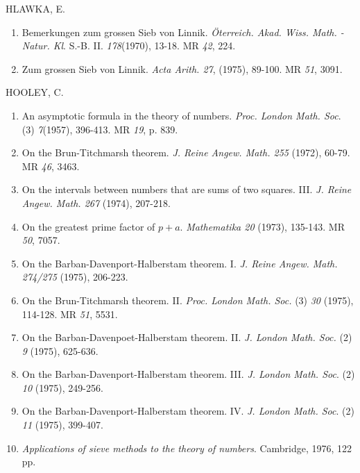 \begin{thebibliography}{99}
 HLAWKA, E.
\begin{enumerate}
\item Bemerkungen zum grossen Sieb von
  Linnik. \textit{\"Oterreich. Akad. Wiss. Math. -
    Natur. Kl}. S.-B. II. {\em 178}(1970), 13-18. MR {\em 42}, 224.

\item Zum grossen Sieb von Linnik. \textit{Acta
  Arith. 27}, (1975), 89-100. MR {\em 51}, 3091. 
\end{enumerate}

 HOOLEY, C.\pageoriginale
\begin{enumerate}
\item An asymptotic formula in the theory of
  numbers. \textit{Proc. London Math. Soc}. (3) {\em 7}(1957),
  396-413. MR {\em 19}, p. 839. 

\item On the Brun-Titchmarsh theorem. \textit{J. Reine
  Angew. Math. 255} (1972), 60-79. MR {\em 46}, 3463. 

\item On the intervals between numbers that are sums of two
  squares. III. \textit{J. Reine Angew. Math. 267} (1974), 207-218. 

\item On the greatest prime factor of $p+a$. \textit{Mathematika 20}
  (1973), 135-143. MR {\em 50}, 7057. 

\item On the Barban-Davenport-Halberstam theorem. I. {\em J. Reine
  Angew. Math. 274/275} (1975), 206-223. 

\item On the Brun-Titchmarsh theorem. II. \textit{Proc. London
  Math. Soc.} (3) {\em 30} (1975), 114-128. MR {\em 51}, 5531. 

\item On the Barban-Davenpoet-Halberstam
  theorem. II. \textit{J. London Math. Soc.} (2) {\em 9} (1975), 625-636. 

\item On the Barban-Davenport-Halberstam
  theorem. III. \textit{J. London Math. Soc}. (2) {\em 10} (1975),
  249-256.  

\item On the Barban-Davenport-Halberstam
  theorem. IV. \textit{J. London Math. Soc}. (2) {\em 11} (1975),
  399-407. 

\item \textit{Applications of sieve methods to the theory of
  numbers}. Cambridge, 1976, 122 pp.
\end{enumerate}


\end{thebibliography}
